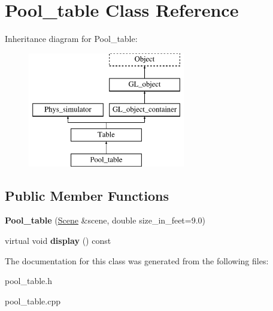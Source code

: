 \hypertarget{class_pool__table}{
\section{Pool\_\-table Class Reference}
\label{class_pool__table}
}
Inheritance diagram for Pool\_\-table:\begin{figure}[H]
\begin{center}
\leavevmode
\includegraphics[height=5.000000cm]{class_pool__table}
\end{center}
\end{figure}
\subsection*{Public Member Functions}
\begin{DoxyCompactItemize}
\item 
\hypertarget{class_pool__table_a09a899036c5ae1d1d94a761e3692df56}{
{\bfseries Pool\_\-table} (\hyperlink{class_scene}{Scene} \&scene, double size\_\-in\_\-feet=9.0)}
\label{class_pool__table_a09a899036c5ae1d1d94a761e3692df56}

\item 
\hypertarget{class_pool__table_a4d7d3c8b11007fd554ca8cf93ef4f312}{
virtual void {\bfseries display} () const }
\label{class_pool__table_a4d7d3c8b11007fd554ca8cf93ef4f312}

\end{DoxyCompactItemize}


The documentation for this class was generated from the following files:\begin{DoxyCompactItemize}
\item 
pool\_\-table.h\item 
pool\_\-table.cpp\end{DoxyCompactItemize}
